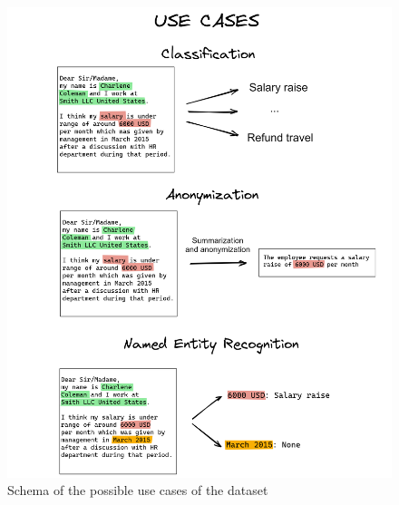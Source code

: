 \begin{figure}[h] 
    \centering
    \includegraphics[width=\textwidth]{images/complete_schema_part2.png}
    \caption{Schema of the possible use cases of the dataset}
    \label{fig:complete_schema_part2}
\end{figure}    
